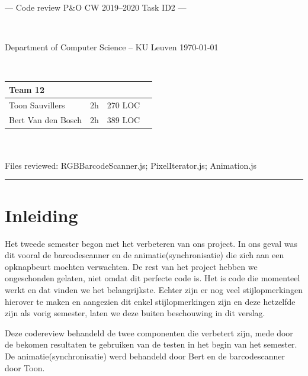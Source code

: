 \documentclass[a4paper,11pt]{article}
\begin{document}
\noindent
\colorbox[HTML]{52BDEC}{\bfseries\parbox{\textwidth}{\centering\large
  --- Code review P\&O CW 2019--2020 Task ID2 ---
}}
\\[-1mm]
\colorbox[HTML]{00407A}{\bfseries\color{white}\parbox{\textwidth}{
  Department of Computer Science -- KU Leuven
  \hfill
  \today
}}
\\

\smallskip

\noindent
\begin{tabular}{*4l}
\toprule
\multicolumn{3}{l}{\large\textbf{Team 12}} \\
\midrule
Toon Sauvillers & 2h & 270 LOC \\ %
Bert Van den Bosch & 2h & 389 LOC \\
\bottomrule
\hline
\end{tabular}\\
\\
Files reviewed: RGBBarcodeScanner.js; PixelIterator.js; Animation.js	

\noindent
{\color[HTML]{52BDEC} \rule{\linewidth}{1mm} }

\smallskip
\section{Inleiding}
Het tweede semester begon met het verbeteren van ons project. In ons geval was dit vooral de barcodescanner en de animatie(synchronisatie) die zich aan een opknapbeurt mochten verwachten. De rest van het project hebben we ongeschonden gelaten, niet omdat dit perfecte code is. Het is code die momenteel werkt en dat vinden we het belangrijkste. Echter zijn er nog veel stijlopmerkingen hierover te maken en aangezien dit enkel stijlopmerkingen zijn en deze hetzelfde zijn als vorig semester, laten we deze buiten beschouwing in dit verslag.

Deze codereview behandeld de twee componenten die verbetert zijn, mede door de bekomen resultaten te gebruiken van de testen in het begin van het semester. De animatie(synchronisatie) werd behandeld door Bert en de barcodescanner door Toon.
\end{document}

